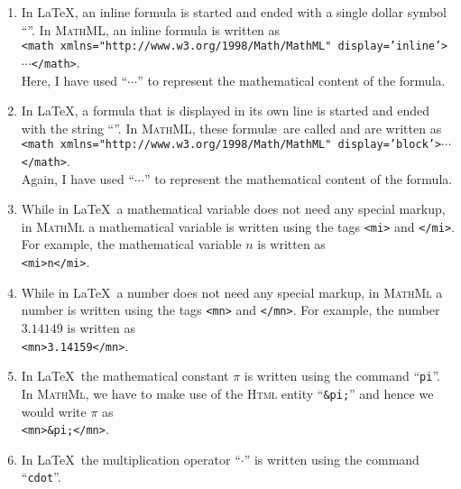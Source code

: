 \begin{enumerate}
\item In \LaTeX, an inline formula is started and ended with a single dollar symbol
      ``\texttt{}''.  
      In \textsc{MathML}, an inline formula is written as
      \\[0.2cm]
      \hspace*{1.3cm}
      \texttt{<math xmlns="http://www.w3.org/1998/Math/MathML" display='inline'>$\cdots$</math>}.
      \\[0.2cm]
      Here, I have used ``$\cdots$'' to represent the mathematical content of the formula.
\item In \LaTeX, a formula that is displayed in its own line is started and ended with the string
      ``\texttt{}''.  
      In \textsc{MathML}, these formul\ae\ are called  and are written as
      \\[0.2cm]
      \hspace*{1.3cm}
      \texttt{<math xmlns="http://www.w3.org/1998/Math/MathML" display='block'>$\cdots$</math>}.
      \\[0.2cm]
      Again, I have used ``$\cdots$'' to represent the mathematical content of the formula.
\item While in \LaTeX\ a mathematical variable does not need any special markup, in \textsc{MathMl}
      a mathematical variable is written using the tags 
      \texttt{<mi>} and \texttt{</mi>}.  For example, the mathematical variable $n$ is written as    
      \\[0.2cm]
      \hspace*{1.3cm}
      \texttt{<mi>n</mi>}.
\item While in \LaTeX\ a number does not need any special markup, in \textsc{MathMl}
      a number is written using the tags 
      \texttt{<mn>} and \texttt{</mn>}.  For example, the number $3.14149$ is written as    
      \\[0.2cm]
      \hspace*{1.3cm}
      \texttt{<mn>3.14159</mn>}.
\item In \LaTeX\ the mathematical constant $\pi$ is written using the command ``\texttt{pi}''.
      In \textsc{MathMl}, we have to make use of the \textsc{Html} entity ``\texttt{\&pi;}'' and
      hence we would write $\pi$ as
      \\[0.2cm]
      \hspace*{1.3cm}
      \texttt{<mn>\&pi;</mn>}.
\item In \LaTeX\ the multiplication operator ``$\cdot$'' is written using the command ``\texttt{cdot}''.

\end{enumerate}
